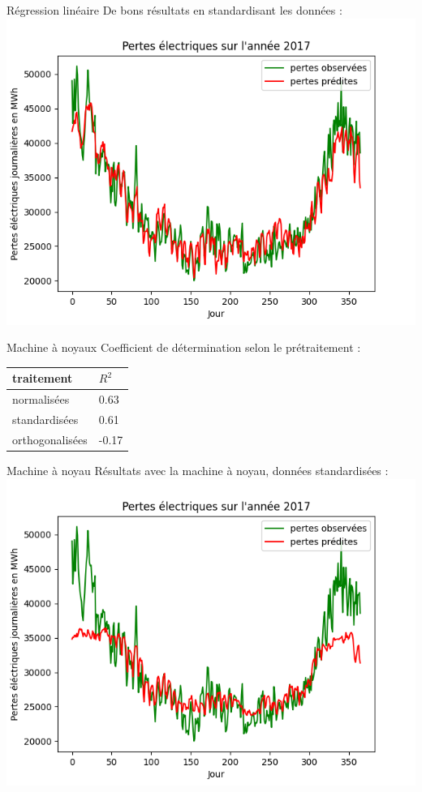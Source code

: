 \begin{frame}{Régression linéaire}
\protect\hypertarget{ruxe9gression-linuxe9aire-1}{}
De bons résultats en standardisant les données :
\includegraphics[scale=.5]{figures/2017_st.png}
\end{frame}

\begin{frame}{Machine à noyaux}
\protect\hypertarget{machine-uxe0-noyaux}{}
Coefficient de détermination selon le prétraitement :

\begin{longtable}[]{@{}ll@{}}
\toprule
\textbf{traitement} & \textbf{\(R^2\)}\tabularnewline
\midrule
\endhead
normalisées & 0.63\tabularnewline
standardisées & 0.61\tabularnewline
orthogonalisées & -0.17\tabularnewline
\bottomrule
\end{longtable}
\end{frame}

\begin{frame}{Machine à noyau}
\protect\hypertarget{machine-uxe0-noyau}{}
Résultats avec la machine à noyau, données standardisées :
\includegraphics[scale=.5]{figures/svr_2017.png}
\end{frame}

